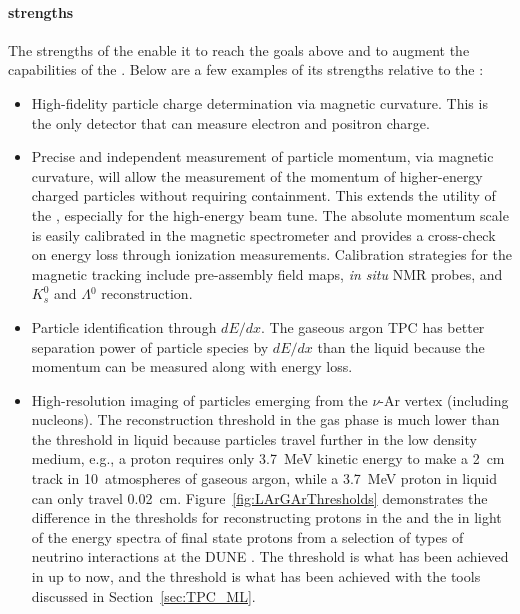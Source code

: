 \paragraph{ strengths}

The strengths of the  enable it to reach the goals above and to augment the capabilities of the . Below are a few examples of its strengths relative to the :
\begin{itemize}
     \item High-fidelity particle charge determination via magnetic curvature. This is the only detector that can measure electron and positron charge.
     
     \item Precise and independent measurement of particle momentum, via magnetic curvature, will allow the measurement of the momentum of higher-energy charged particles without requiring containment. This extends the utility of the  , especially for the high-energy beam tune. The absolute momentum scale is easily calibrated in the magnetic spectrometer and provides a cross-check on energy loss through ionization measurements.  Calibration strategies for the magnetic tracking include pre-assembly field maps, {\it in situ} NMR probes, and $K^0_s$ and $\Lambda\!^0$ reconstruction.
     
      \item Particle identification through $dE/dx$. The gaseous argon TPC has better separation power of particle species by $dE/dx$ than the liquid because the momentum can be measured along with energy loss. 
      
      \item High-resolution imaging of particles emerging from the $\nu$-Ar vertex (including nucleons).  The reconstruction threshold in the gas phase is much lower than the threshold in liquid because particles travel further in the low density medium, e.g., a proton requires only \SI{3.7}{MeV} kinetic energy to make a \SI{2}{cm} track in 10~atmospheres of gaseous argon, while a \SI{3.7}{MeV} proton in liquid can only travel \SI{0.02}{cm}. Figure~\ref{fig:LArGArThresholds} demonstrates the difference in the thresholds for reconstructing protons in the  and the  in light of the energy spectra of final state protons from a selection of types of neutrino interactions at the DUNE . The  threshold is what has been achieved in  up to now, and the  threshold is what has been achieved with the tools discussed in Section~\ref{sec:TPC_ML}.
   

\end{itemize}
